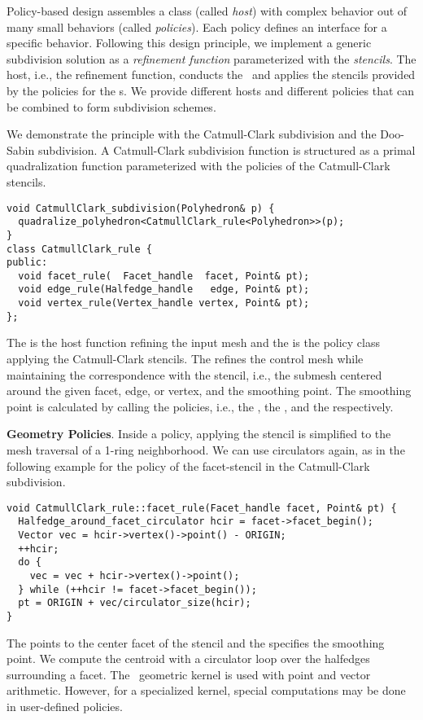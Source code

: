 
Policy-based design \cite{Alexandrescu:2001:MCD} assembles a class
(called \emph{host}) with complex behavior out of many small behaviors
(called \emph{policies}). Each policy defines an interface for a
specific behavior. Following this design principle, we implement a
generic subdivision solution as a \emph{refinement function\/}
parameterized with the \emph{stencils}. The host, i.e., the refinement
function, conducts the \tr\ and applies the stencils provided by the
policies for the \gm s. We provide different hosts and different
policies that can be combined to form subdivision schemes.

We demonstrate the principle with the Catmull-Clark 
subdivision and the Doo-Sabin subdivision. 
A Catmull-Clark subdivision function is structured 
as a primal quadralization function parameterized 
with the policies of the Catmull-Clark stencils.
\begin{lstlisting}
void CatmullClark_subdivision(Polyhedron& p) {
  quadralize_polyhedron<CatmullClark_rule<Polyhedron>>(p);
}
class CatmullClark_rule {
public:
  void facet_rule(  Facet_handle  facet, Point& pt);
  void edge_rule(Halfedge_handle   edge, Point& pt);
  void vertex_rule(Vertex_handle vertex, Point& pt);
};
\end{lstlisting}
The  is the host function
refining the input mesh
and the  is the policy class applying the
Catmull-Clark stencils. The  
refines the control mesh while maintaining the 
correspondence with the stencil, i.e., the submesh centered 
around the given facet, edge, or
vertex, and the smoothing point. The smoothing point
is calculated by calling the policies, i.e.,
the , the ,
and the  respectively.

\noindent\textbf{Geometry Policies}.
Inside a policy, applying the stencil is simplified to
the mesh traversal of a 1-ring neighborhood. We can use circulators
again, as in the following example for the policy of the facet-stencil 
in the Catmull-Clark subdivision.
\begin{lstlisting}
void CatmullClark_rule::facet_rule(Facet_handle facet, Point& pt) {
  Halfedge_around_facet_circulator hcir = facet->facet_begin();
  Vector vec = hcir->vertex()->point() - ORIGIN;
  ++hcir;
  do {
    vec = vec + hcir->vertex()->point();
  } while (++hcir != facet->facet_begin());
  pt = ORIGIN + vec/circulator_size(hcir);
}
\end{lstlisting}
The  points to the 
center facet of the stencil and the  
specifies the smoothing point. We compute the centroid with a
circulator loop over the halfedges surrounding a facet. The \cgal\
geometric kernel is used with point and vector arithmetic.
However, for a specialized kernel, special computations may be 
done in user-defined policies.
 
